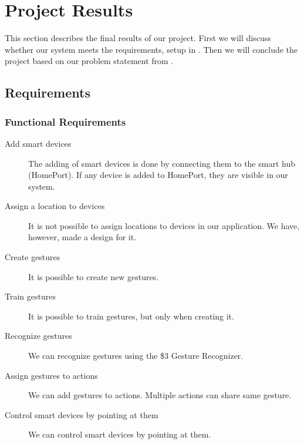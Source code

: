 \section{Project Results}\label{sec:results}
This section describes the final results of our project. 
First we will discuss whether our system meets the requirements, 
setup in . 
Then we will conclude the project based on our problem statement from .

\subsection{Requirements}\label{sec:conclusion-requirements}
\subsubsection{Functional Requirements}
\begin{description}
  \item[\yes Add smart devices] The adding of smart devices is done by connecting them to the smart hub (HomePort). If any device is added to HomePort, they are visible in our system. 
  \item[\no Assign a location to devices] It is not possible to assign locations to devices in our application. We have, however, made a design for it. 
  \item[\yes Create gestures] It is possible to create new gestures.
  \item[\yes Train gestures] It is possible to train gestures, but only when creating it. 
  \item[\yes Recognize gestures] We can recognize gestures using the \$3 Gesture Recognizer.
  \item[\yes Assign gestures to actions] We can add gestures to actions. Multiple actions can share same gesture.  
  \item[\yes Control smart devices by pointing at them] We can control smart devices by pointing at them.
\end{description}

